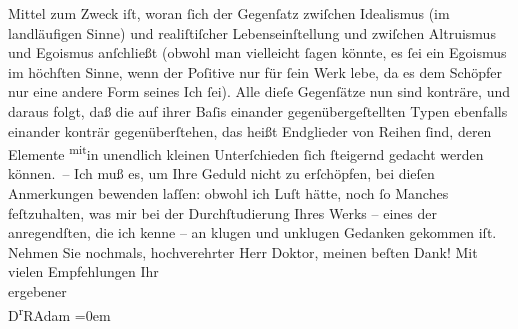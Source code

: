                Mittel zum Zweck iſt, woran ſich der Gegenſatz zwiſchen Idealismus (im landläufigen
               Sinne) und realiſtiſcher Lebenseinſtellung und zwiſchen Altruismus und Egoismus
               anſchließt (obwohl man vielleicht ſagen könnte, es ſei ein Egoismus im höchſten
               Sinne, wenn der Poſitive nur für ſein Werk lebe, da es dem Schöpfer nur eine andere
               Form seines Ich ſei). {\pb}Alle dieſe
               Gegenſätze nun sind konträre, und daraus folgt, daß die auf ihrer Baſis einander
               gegenübergeſtellten Typen ebenfalls einander konträr gegenüberſtehen, das heißt
               Endglieder von Reihen ſind, deren Elemente \substVorne{}\textsuperscript{mit}\substDazwischen{}in\substHinten{} unendlich kleinen Unterſchieden ſich ſteigernd gedacht werden können. –\pend
           \pstart
           Ich muß es, um Ihre Geduld nicht zu erſchöpfen, \strikeout{\textcolor{gray}{an}} bei dieſen Anmerkungen bewenden laſſen: obwohl ich Luſt hätte, noch ſo Manches
               feſtzuhalten, was mir bei der Durchſtudierung Ihres Werks – eines der anregendſten,
               die ich kenne – an klugen und unklugen Gedanken gekommen iſt.\pend
           \pstart
           Nehmen Sie nochmals, hochverehrter Herr Doktor, meinen beſten {\pb}Dank!\pend
           \pstart
           Mit vielen Empfehlungen Ihr{\\[\baselineskip]}ergebener{\\[\baselineskip]}\spacefill\mbox{D\textsuperscript{r}RAdam}\pend
           \leftskip=0em{}\endnumbering{}  
      